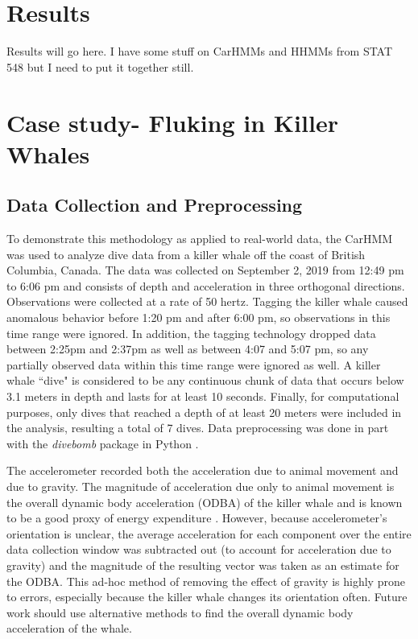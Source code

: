 
\section{Results}

Results will go here. I have some stuff on CarHMMs and HHMMs from STAT 548 but I need to put it together still.

\iffalse
\section{Case study- Fluking in Killer Whales}

\subsection{Data Collection and Preprocessing}

To demonstrate this methodology as applied to real-world data, the CarHMM was used to analyze dive data from a killer whale off the coast of British Columbia, Canada. The data was collected on September 2, 2019 from 12:49 pm to 6:06 pm and consists of depth and acceleration in three orthogonal directions. Observations were collected at a rate of 50 hertz. Tagging the killer whale caused anomalous behavior before 1:20 pm and after 6:00 pm, so observations in this time range were ignored. In addition, the tagging technology dropped data between 2:25pm and 2:37pm as well as between 4:07 and 5:07 pm, so any partially observed data within this time range were ignored as well. A killer whale ``dive" is considered to be any continuous chunk of data that occurs below 3.1 meters in depth and lasts for at least 10 seconds. Finally, for computational purposes, only dives that reached a depth of at least 20 meters were included in the analysis, resulting a total of 7 dives. Data preprocessing was done in part with the \textit{divebomb} package in Python \cite{Nunes:2018}.

The accelerometer recorded both the acceleration due to animal movement and due to gravity. The magnitude of acceleration due only to animal movement is the overall dynamic body acceleration (ODBA) of the killer whale and is known to be a good proxy of energy expenditure \cite{Gleiss:2011}. However, because accelerometer's orientation is unclear, the average acceleration for each component over the entire data collection window was subtracted out (to account for acceleration due to gravity) and the magnitude of the resulting vector was taken as an estimate for the ODBA. This ad-hoc method of removing the effect of gravity is highly prone to errors, especially because the killer whale changes its orientation often. Future work should use alternative methods to find the overall dynamic body acceleration of the whale.

